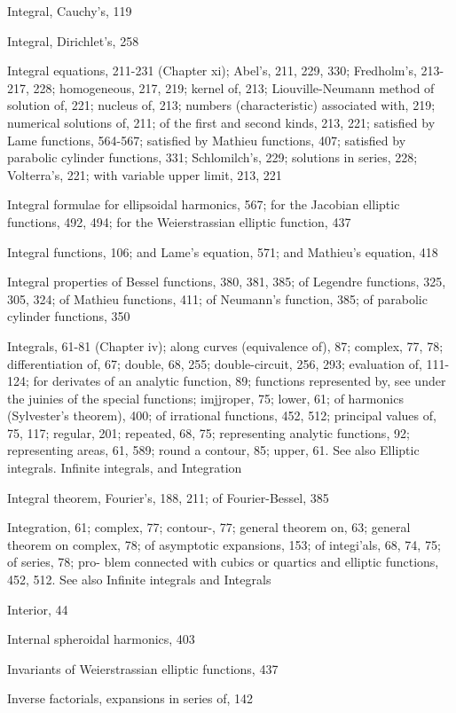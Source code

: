 Integral, Cauchy's, 119

Integral, Dirichlet's, 258

Integral equations, 211-231 (Chapter xi); Abel's, 211, 229, 330; Fredholm's, 213-217, 228;
homogeneous, 217, 219; kernel of, 213; Liouville-Neumann method of solution of, 221;
nucleus of, 213; numbers (characteristic) associated with, 219; numerical solutions of, 211;
of the first and second kinds, 213, 221; satisfied by Lame functions, 564-567; satisfied by
Mathieu functions, 407; satisfied by parabolic cylinder functions, 331; Schlomilch's, 229;
solutions in series, 228; Volterra's, 221; with variable upper limit, 213, 221

Integral formulae for ellipsoidal harmonics, 567; for the Jacobian elliptic functions, 492, 494;
for the Weierstrassian elliptic function, 437

Integral functions, 106; and Lame's equation, 571; and Mathieu's equation, 418

Integral properties of Bessel functions, 380, 381, 385; of Legendre functions, 325, 305, 324; of
Mathieu functions, 411; of Neumann's function, 385; of parabolic cylinder functions, 350

Integrals, 61-81 (Chapter iv); along curves (equivalence of), 87; complex, 77, 78; differentiation
of, 67; double, 68, 255; double-circuit, 256, 293; evaluation of, 111-124; for derivates of an
analytic function, 89; functions represented by, see under the juinies of the special functions;
imjjroper, 75; lower, 61; of harmonics (Sylvester's theorem), 400; of irrational functions,
452, 512; principal values of, 75, 117; regular, 201; repeated,
68, 75; representing analytic functions, 92; representing areas, 61, 589; round a contour,
85; upper, 61. See also Elliptic integrals. Infinite integrals, and Integration

Integral theorem, Fourier's, 188, 211; of Fourier-Bessel, 385

Integration, 61; complex, 77; contour-, 77; general theorem on, 63; general theorem on
complex, 78; of asymptotic expansions, 153; of integi'als, 68, 74, 75; of series, 78; pro-
blem connected with cubics or quartics and elliptic functions, 452, 512. See also Infinite
integrals and Integrals

Interior, 44

Internal spheroidal harmonics, 403

Invariants of Weierstrassian elliptic functions, 437

Inverse factorials, expansions in series of, 142

